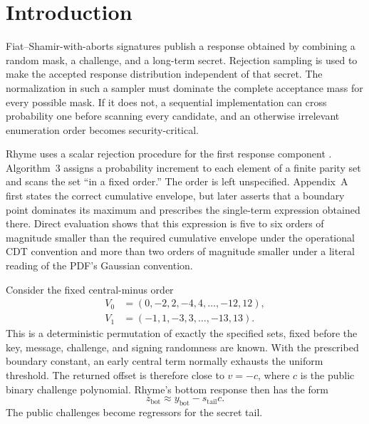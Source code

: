 \documentclass[11pt,a4paper]{article}
\begin{document}
\section{Introduction}

Fiat--Shamir-with-aborts signatures publish a response obtained by combining
a random mask, a challenge, and a long-term secret.  Rejection sampling is
used to make the accepted response distribution independent of that secret.
The normalization in such a sampler must dominate the complete acceptance
mass for every possible mask.  If it does not, a sequential implementation
can cross probability one before scanning every candidate, and an otherwise
irrelevant enumeration order becomes security-critical.

Rhyme uses a scalar rejection procedure for the first response component
\cite{rhyme-spec}.  Algorithm~3 assigns a probability increment to each
element of a finite parity set and scans the set ``in a fixed order.''  The
order is left unspecified.  Appendix~A first states the correct cumulative
envelope, but later asserts that a boundary point dominates its maximum and
prescribes the single-term expression obtained there.  Direct evaluation
shows that this expression is five to six orders of magnitude smaller than
the required cumulative envelope under the operational CDT convention and
more than two orders of magnitude smaller under a literal reading of the
PDF's Gaussian convention.

Consider the fixed central-minus order
\begin{align*}
 V_0&=(0,-2,2,-4,4,\ldots,-12,12),\\
 V_1&=(-1,1,-3,3,\ldots,-13,13).
\end{align*}
This is a deterministic permutation of exactly the specified sets, fixed
before the key, message, challenge, and signing randomness are known.  With
the prescribed boundary constant, an early central term normally exhausts
the uniform threshold.  The returned offset is therefore close to $v=-c$,
where $c$ is
the public binary challenge polynomial.  Rhyme's bottom response then has the
form
\[
 z_{\mathrm{bot}}\approx y_{\mathrm{bot}}-s_{\mathrm{tail}}c.
\]
The public challenges become regressors for the secret tail.
\end{document}
